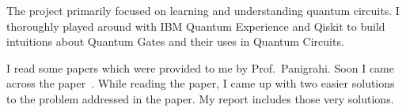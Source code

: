 \documentclass[main.tex]{subfiles}
\begin{document}
	
    The project primarily focused on learning and understanding quantum circuits. I thoroughly played around with IBM Quantum Experience and Qiskit to build intuitions about Quantum Gates and their uses in Quantum Circuits. \par
    I read some papers which were provided to me by Prof.\ Panigrahi. Soon I came across the paper~\cite{mahanti2019quantum}. While reading the paper, I came up with two easier solutions to the problem addressed in the paper. My report includes those very solutions.
\end{document}
